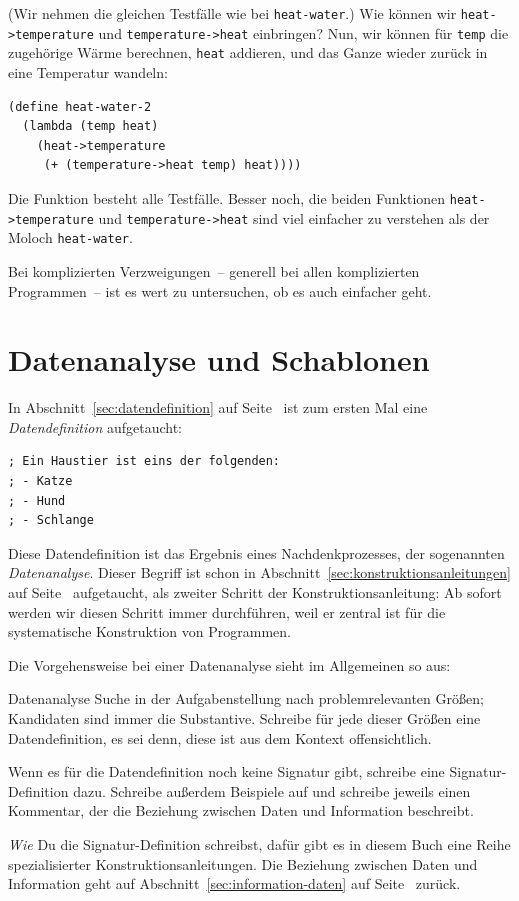 %
(Wir nehmen die gleichen Testfälle wie bei \lstinline{heat-water}.)
Wie können wir \lstinline{heat->temperature} und
\lstinline{temperature->heat} einbringen?  Nun, wir können für
\lstinline{temp} die zugehörige Wärme berechnen, \lstinline{heat}
addieren, und das Ganze wieder zurück in eine Temperatur wandeln:
%
\begin{lstlisting}
(define heat-water-2
  (lambda (temp heat)
    (heat->temperature
     (+ (temperature->heat temp) heat))))
\end{lstlisting}
%
Die Funktion besteht alle Testfälle.  Besser noch, die
beiden Funktionen \lstinline{heat->temperature} und
\lstinline{temperature->heat} sind viel einfacher zu verstehen als der
Moloch \lstinline{heat-water}.

Bei komplizierten Verzweigungen~-- generell bei allen komplizierten
Programmen~-- ist es wert zu untersuchen, ob es auch einfacher geht.

\section{Datenanalyse und Schablonen}
\label{sec:datenanalyse}

In Abschnitt~\ref{sec:datendefinition} auf
Seite~\pageref{sec:datendefinition} ist zum ersten Mal eine
\textit{Datendefinition} aufgetaucht:
%
\begin{lstlisting}
; Ein Haustier ist eins der folgenden:
; - Katze
; - Hund
; - Schlange
\end{lstlisting}
%
Diese Datendefinition ist das Ergebnis eines Nachdenkprozesses, der
sogenannten \textit{Datenanalyse}.  Dieser Begriff
ist schon in Abschnitt~\ref{sec:konstruktionsanleitungen} auf
Seite~\pageref{sec:konstruktionsanleitungen} aufgetaucht, als zweiter
Schritt der Konstruktionsanleitung: Ab sofort werden wir diesen
Schritt immer durchführen, weil er zentral ist für die systematische
Konstruktion von Programmen.

Die Vorgehensweise bei einer Datenanalyse sieht im Allgemeinen so aus:
%
\begin{konstruktionsanleitung}{Datenanalyse}
  Suche in der Aufgabenstellung nach problemrelevanten Größen;
  Kandidaten sind immer die Substantive. Schreibe für jede dieser
  Größen eine Datendefinition, es sei denn, diese ist aus dem Kontext
  offensichtlich.

  Wenn es für die Datendefinition noch keine Signatur gibt, schreibe
  eine Signatur-Definition dazu.  Schreibe außerdem Beispiele auf und
  schreibe jeweils einen Kommentar, der die Beziehung zwischen Daten
  und Information beschreibt.
\end{konstruktionsanleitung}
%
\emph{Wie} Du die Signatur-Definition schreibst, dafür gibt es in
diesem Buch eine Reihe spezialisierter Konstruktionsanleitungen.  Die
Beziehung zwischen Daten und Information geht auf
Abschnitt~\ref{sec:information-daten} auf
Seite~\pageref{sec:information-daten} zurück.

